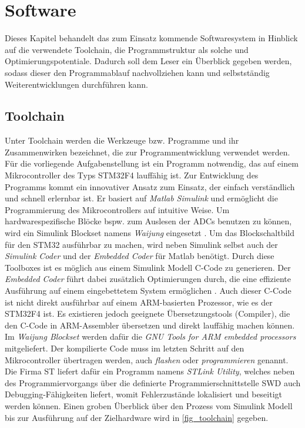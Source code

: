 \chapter{Software}\label{kap6}
Dieses Kapitel behandelt das zum Einsatz kommende Softwaresystem in Hinblick auf die verwendete Toolchain, die Programmstruktur als solche und Optimierungspotentiale. Dadurch soll dem Leser ein Überblick gegeben werden, sodass dieser den Programmablauf nachvollziehen kann und selbstständig Weiterentwicklungen durchführen kann.

\section{Toolchain}
Unter Toolchain werden die Werkzeuge bzw. Programme und ihr Zusammenwirken bezeichnet, die zur Programmentwicklung verwendet werden.\\ Für die vorliegende Aufgabenstellung ist ein Programm notwendig, das auf einem Mikrocontroller des Typs STM32F4 lauffähig ist. Zur Entwicklung des Programms kommt ein innovativer Ansatz zum Einsatz, der einfach verständlich und schnell erlernbar ist. Er basiert auf \textit{Matlab Simulink} und ermöglicht die Programmierung des Mikrocontrollers auf intuitive Weise. Um hardwarespezifische Blöcke bspw. zum Auslesen der ADCs benutzen zu können, wird ein Simulink Blockset namens \textit{Waijung} eingesetzt \cite{waijung}. Um das Blockschaltbild für den STM32 ausführbar zu machen, wird neben Simulink selbst auch der \textit{Simulink Coder} und der \textit{Embedded Coder} für Matlab benötigt. Durch diese Toolboxes ist es möglich aus einem Simulink Modell  C-Code zu generieren\cite{simulinkCoder}. Der \textit{Embedded Coder} führt dabei zusätzlich Optimierungen durch, die eine effiziente Ausführung auf einem eingebettetem System ermöglichen \cite{embeddedCoder}. 
Auch dieser C-Code ist nicht direkt ausführbar auf einem ARM-basierten Prozessor, wie es der STM32F4 ist. Es existieren jedoch geeignete Übersetzungstools (Compiler), die den C-Code in ARM-Assembler übersetzen und direkt lauffähig machen können. Im \textit{Waijung Blockset} werden dafür die \textit{GNU Tools for ARM embedded processors} mitgeliefert. Der kompilierte Code muss im letzten Schritt auf den Mikrocontroller übertragen werden, auch \textit{flashen} oder \textit{programmieren} genannt. Die Firma ST liefert dafür ein Programm namens \textit{STLink Utility}, welches neben des Programmiervorgangs über die definierte Programmierschnittstelle SWD auch Debugging-Fähigkeiten liefert, womit Fehlerzustände lokalisiert und beseitigt werden können. Einen groben Überblick über den Prozess vom Simulink  Modell bis zur Ausführung auf der Zielhardware wird in \autoref{fig_toolchain} gegeben.

